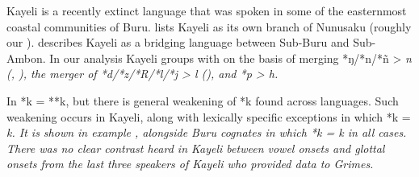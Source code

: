 Kayeli is a recently extinct language \citep{Grimes2010b} that
was spoken in some of the easternmost coastal communities of Buru.
\citet[20]{Collins1983} lists Kayeli as its own branch of Nunusaku (roughly our ).
\citet[8]{Stresemann1927} describes Kayeli as a bridging language
between Sub-Buru and Sub-Ambon.
In our analysis  Kayeli groups with  on the
basis of merging *ŋ/*n/*ñ > \it{n} (,
), the merger of *d/*z/*R/*l/*j > \it{l} (),
and *p > \it{h}.

In  *k = **k,
but there is general weakening of *k found across  languages.
Such weakening occurs in Kayeli,
along with lexically specific exceptions in which *k = \it{k}.
It is shown in example ,
alongside Buru cognates in which *k = \it{k} in all cases.
There was no clear contrast heard in Kayeli between vowel onsets
and glottal onsets from the last three speakers of Kayeli who
provided data to Grimes.


